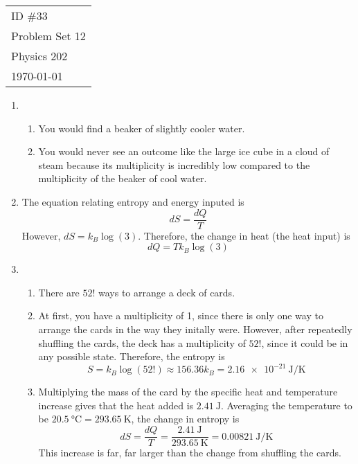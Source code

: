 \documentclass[fleqn]{article}[12pt]
\begin{document}
    \begin{tabular}{l}
        ID \#33 \\
        Problem Set 12 \\
        Physics 202 \\
        \today
    \end{tabular}

\begin{enumerate}
    \item \begin{enumerate}
        \item You would find a beaker of slightly cooler water.
        \item You would never see an outcome like the large ice cube in a cloud of steam because its multiplicity is incredibly low compared to the multiplicity of the beaker of cool water.
    \end{enumerate}

    \item The equation relating entropy and energy inputed is
    \begin{equation*}
        dS = \frac{dQ}{T}
    \end{equation*}
    However, $dS = k_B \log(3)$. Therefore, the change in heat (the heat input) is
    \begin{equation*}
        dQ = Tk_B\log(3)
    \end{equation*}

    \item \begin{enumerate}
        \item There are $52!$ ways to arrange a deck of cards.
        \item At first, you have a multiplicity of 1, since there is only one way to arrange the cards in the way they initally were. However, after repeatedly shuffling the cards, the deck has a multiplicity of $52!$, since it could be in any possible state. Therefore, the entropy is
        \begin{equation*}
            S = k_B \log(52!) \approx 156.36k_B = \SI{2.16e-21}{\joule/\kelvin}
        \end{equation*}

        \item Multiplying the mass of the card by the specific heat and temperature increase gives that the heat added is $\SI{2.41}{\joule}$. Averaging the temperature to be $\SI{20.5}{\celsius} = \SI{293.65}{\kelvin}$, the change in entropy is
        \begin{equation*}
            dS = \frac{dQ}T = \frac{\SI{2.41}{\joule}}{\SI{293.65}{\kelvin}} = \SI{0.00821}{\joule/\kelvin}
        \end{equation*}
        This increase is far, far larger than the change from shuffling the cards.
    \end{enumerate}


\end{enumerate}
\end{document}

